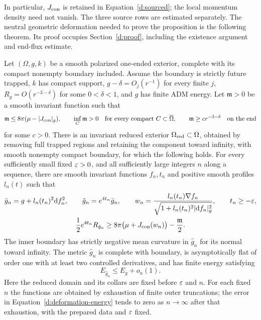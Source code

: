 In particular, $J_{\rm con}$ is retained in
Equation~\eqref{d:sourced}; the local momentum density need
not vanish.  The three source rows are estimated separately.  The
neutral geometric deformation needed to prove the proposition is the
following theorem.  Its proof occupies Section~\ref{d:proof}, including
the existence argument and end-flux estimate.

\begin{theorem}\label{d:deformation}
Let $(\Omega,g,k)$ be a smooth polarized one-ended exterior, complete
with its compact nonempty boundary included.  Assume the boundary is
strictly future trapped, $k$ has compact support, $g-\delta=O_j(r^{-1})$
for every finite $j$, $R_g=O(r^{-3-\delta})$ for some $0<\delta<1$,
and $g$ has finite ADM energy.  Let $\mathfrak m>0$ be a smooth
invariant function such that
\[
 \mathfrak m\le8\pi(\mu-|J_{\rm con}|_g),\qquad
 \inf_C\mathfrak m>0\quad\text{for every compact }C\subset\overline\Omega,
 \qquad \mathfrak m\ge c r^{-3-\delta}\quad\text{on the end}
\]
for some $c>0$.  There is an invariant reduced exterior
$\Omega_{\rm red}\subset\Omega$, obtained by removing full trapped
regions and retaining the component toward infinity, with smooth
nonempty compact boundary, for which the following holds.  For every
sufficiently small fixed $\varepsilon>0$, and all sufficiently large integers
$n$ along a sequence, there are smooth invariant functions $f_n,t_n$
and positive smooth profiles $l_n(t)$ such that
\begin{gather}\label{d:deformed-metrics}
 \bar g_n=g+l_n(t_n)^2\mathrm d f_n^2,\qquad
 \hat g_n=e^{4t_n}\bar g_n,\qquad
 w_n=\frac{l_n(t_n)\nabla f_n}{\sqrt{1+l_n(t_n)^2|\mathrm d f_n|_g^2}},
 \qquad t_n\ge-\varepsilon,\\
 \frac12e^{4t_n}R_{\hat g_n}
 \ge8\pi\bigl(\mu+J_{\rm con}(w_n)\bigr)-\frac{\mathfrak m}{2}.
 \label{d:deformation-curvature}
\end{gather}
The inner boundary has strictly negative mean curvature in $\hat g_n$
for its normal toward infinity.  The metric $\hat g_n$ is complete
with boundary, is asymptotically flat of order one with at least two
controlled derivatives, and has finite energy satisfying
\begin{equation}\label{d:deformation-energy}
 E_{\hat g_n}\le E_g+o_n(1).
\end{equation}
Here the reduced domain and its collars are fixed before $\varepsilon$ and
$n$.  For each fixed $n$ the functions are obtained by exhaustion of
finite outer truncations; the error in
Equation~\eqref{d:deformation-energy} tends to zero as $n\to\infty$
after that exhaustion, with the prepared data and $\varepsilon$ fixed.
\end{theorem}

